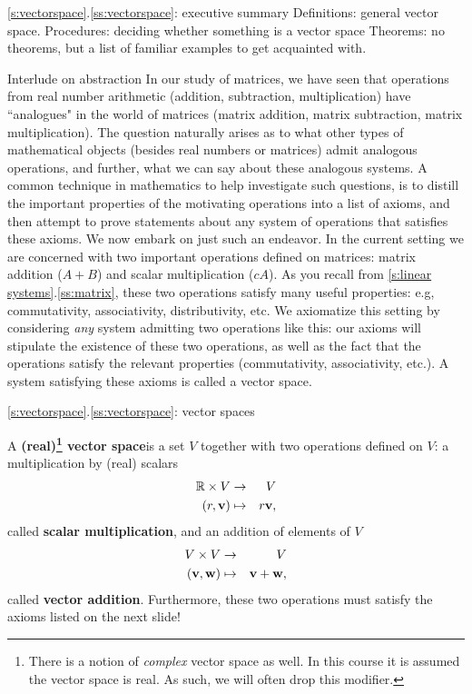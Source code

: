 \begin{frame}{\ref{s:vectorspace}.\ref{ss:vectorspace}: executive summary}
\alert{Definitions:} general vector space.
\bspace
\alert{Procedures:} deciding whether something is a vector space 
\bspace
\alert{Theorems:} no theorems, but a list of familiar examples to get acquainted with. 
\end{frame}
\begin{frame}{Interlude on abstraction}
In our study of matrices, we have seen that operations from real number arithmetic (addition, subtraction, multiplication) have ``analogues" in the world of matrices (matrix addition, matrix subtraction, matrix multiplication). 
\bpause
The question naturally arises as to what other types of mathematical objects (besides real numbers or matrices) admit analogous operations, and further, what we can say about these analogous systems. 
\bpause A common technique in mathematics to help investigate such questions, is to distill the important properties of the motivating operations into a list of \alert{axioms}, and then attempt to prove statements about any system of operations that satisfies these axioms. 
\bpause We now embark on just such an endeavor. In the current setting we are concerned with two important operations defined on matrices: matrix addition ($A+B$) and scalar multiplication ($cA$). As you recall from \ref{s:linear systems}.\ref{ss:matrix}, these two operations satisfy many useful properties: e.g, commutativity, associativity, distributivity, etc. 
\bpause We \alert{axiomatize} this setting by considering {\em any} system admitting two operations like this: our axioms will stipulate the existence of these two operations, as well as the fact that the operations satisfy the relevant properties (commutativity, associativity, etc.). A system satisfying these axioms is called a \alert{vector space}. 
\end{frame}
\begin{frame}{\ref{s:vectorspace}.\ref{ss:vectorspace}: vector spaces}
\begin{definition}
A {\bf (real)\footnote{There is a notion of {\em complex} vector space as well. In this course it is assumed the vector space is real. As such, we will often drop this modifier. } vector space}is a set $V$ together with two operations defined on $V$: a multiplication by (real) scalars
\begin{eqnarray*}
{\mathbb R}\times V&\rightarrow& V\\
(r,{\mathbf v})&\mapsto& r{\mathbf v},
\end{eqnarray*}
called {\bf scalar multiplication}, and an addition of elements of $V$
\begin{eqnarray*}
V\times V&\rightarrow& V \\
({\mathbf v},{\mathbf w})&\mapsto& {\mathbf v}+{\mathbf w},
\end{eqnarray*}
called {\bf vector addition}. 
\bpause Furthermore, these two operations must satisfy the axioms listed on the next slide! 

\end{definition}
\end{frame}

